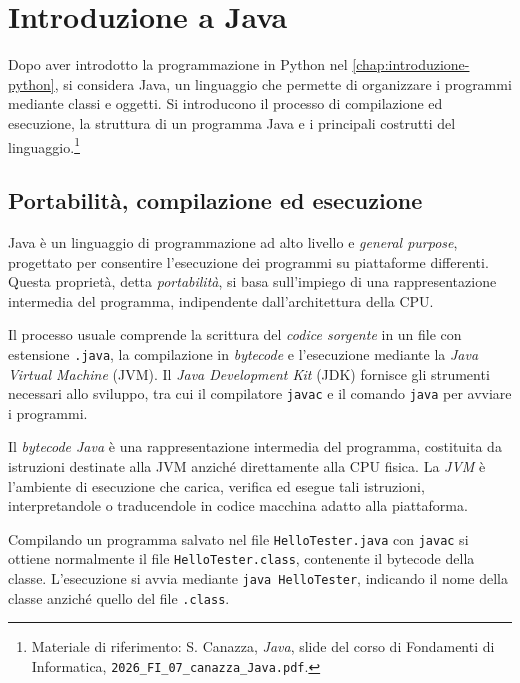 \chapter{Introduzione a Java}
\label{chap:introduzione-java}

Dopo aver introdotto la programmazione in Python nel
\cref{chap:introduzione-python}, si considera Java, un linguaggio
che permette di organizzare i programmi mediante classi e oggetti.
Si introducono il processo di compilazione ed esecuzione,
la struttura di un programma Java e i principali costrutti
del linguaggio.\footnote{Materiale
di riferimento: S. Canazza, \emph{Java}, slide del corso di
Fondamenti di Informatica,
\nolinkurl{2026_FI_07_canazza_Java.pdf}.}

\section{Portabilità, compilazione ed esecuzione}
\label{sec:fi-java-esecuzione}

Java è un linguaggio di programmazione ad alto livello e
\emph{general purpose}, progettato per consentire l'esecuzione
dei programmi su piattaforme differenti. Questa proprietà,
detta \emph{portabilità}, si basa sull'impiego di una
rappresentazione intermedia del programma, indipendente
dall'architettura della CPU.

Il processo usuale comprende la scrittura del \emph{codice sorgente}
in un file con estensione \texttt{.java}, la compilazione in
\emph{bytecode} e l'esecuzione mediante la \emph{Java Virtual Machine}
(JVM). Il \emph{Java Development Kit} (JDK) fornisce gli strumenti
necessari allo sviluppo, tra cui il compilatore \texttt{javac}
e il comando \texttt{java} per avviare i programmi.

\begin{definition}
\label{def:fi-java-jvm}
Il \emph{bytecode Java} è una rappresentazione intermedia del
programma, costituita da istruzioni destinate alla JVM anziché
direttamente alla CPU fisica. La \emph{JVM} è l'ambiente di
esecuzione che carica, verifica ed esegue tali istruzioni,
interpretandole o traducendole in codice macchina adatto
alla piattaforma.
\end{definition}

Compilando un programma salvato nel file
\nolinkurl{HelloTester.java} con \texttt{javac} si ottiene
normalmente il file \nolinkurl{HelloTester.class}, contenente
il bytecode della classe. L'esecuzione si avvia mediante
\texttt{java HelloTester}, indicando il nome della classe
anziché quello del file \texttt{.class}.

